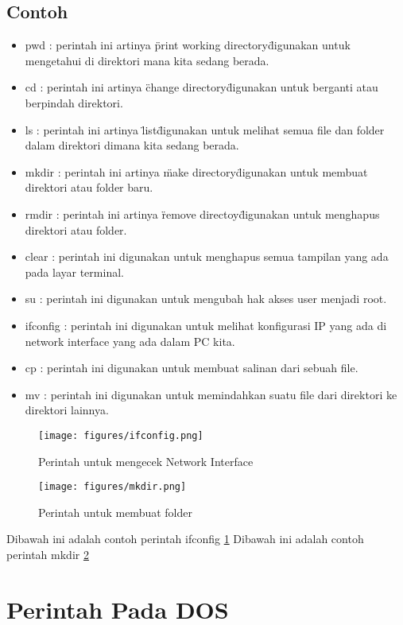 		\subsection{Contoh}
		\begin{itemize}
			\item pwd : perintah ini artinya \"print working directory\" digunakan untuk mengetahui di direktori mana kita sedang berada.
			\item cd : perintah ini artinya \"change directory\" digunakan untuk berganti atau berpindah direktori.
			\item ls : perintah ini artinya \"list\" digunakan untuk melihat semua file dan folder dalam direktori dimana kita sedang berada.
			\item mkdir : perintah ini artinya \"make directory\" digunakan untuk membuat direktori atau folder baru.
			\item rmdir : perintah ini artinya \"remove directoy\" digunakan untuk menghapus direktori atau folder.
			\item clear : perintah ini digunakan untuk menghapus semua tampilan yang ada pada layar terminal.
			\item su : perintah ini digunakan untuk mengubah hak akses user menjadi root.
			\item ifconfig : perintah ini digunakan untuk melihat konfigurasi IP yang ada di network interface yang ada dalam PC kita.
			\item cp : perintah ini digunakan untuk membuat salinan dari sebuah file.
			\item mv : perintah ini digunakan untuk memindahkan suatu file dari direktori ke direktori lainnya.
		\end{itemize}
			\begin{figure}[ht]
			\centerline{\texttt{[image: figures/ifconfig.png]}}
			\caption{Perintah untuk mengecek Network Interface}
			\label{ifconfig}
			\end{figure}
			
			\begin{figure}[ht]
			\centerline{\texttt{[image: figures/mkdir.png]}}
			\caption{Perintah untuk membuat folder}
			\label{mkdir}
			\end{figure}
		Dibawah ini adalah contoh perintah ifconfig \ref{ifconfig}
		Dibawah ini adalah contoh perintah mkdir \ref{mkdir}
		
\pagebreak
	
	\section{Perintah Pada DOS}
